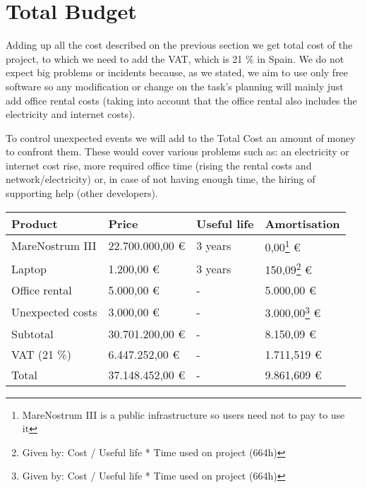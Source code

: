 \section{Total Budget}

Adding up all the cost described on the previous section we get total cost of the project, to which we need to add the VAT, which is 21 \% in Spain. We do not expect big problems or incidents because, as we stated, we aim to use only free software so any modification or change on the task's planning will mainly just add office rental costs (taking into account that the office rental also includes the electricity and internet costs).

To control unexpected events we will add to the Total Cost an amount of money to confront them. These would cover various problems such as: an electricity or internet cost rise, more required office time (rising the rental costs and network/electricity) or, in case of not having enough time, the hiring of supporting help (other developers).


\begin{center}
	\begin{tabular}{| R{4cm} | L{3cm} | L{2cm} | L{3cm} |}
	\hline
	Product & Price & Useful life & Amortisation \\ 
	\hline \hline
	MareNostrum III & 22.700.000,00 \euro & 3 years & 0,00\footnote{ MareNostrum III is a public infrastructure so users need not to pay to use it} \euro \\
	\hline
	Laptop & 1.200,00 \euro & 3 years & 150,09\footnote{ Given by: Cost / Useful life * Time used on project (664h)} \euro \\
	\hline
	Office rental & 5.000,00 \euro & - & 5.000,00 \euro \\
	\hline
	Unexpected costs & 3.000,00 \euro & - & 3.000,00\footnote{ Given by: Cost / Useful life * Time used on project (664h)} \euro \\
	\hline
	\hline
	Subtotal & 30.701.200,00 \euro & - & 8.150,09 \euro \\
	\hline
	VAT (21 \%) & 6.447.252,00 \euro & - & 1.711,519 \euro \\
	\hline
	\hline
	Total & 37.148.452,00 \euro & - & 9.861,609 \euro \\
	\hline
	\end{tabular}
\end{center}
